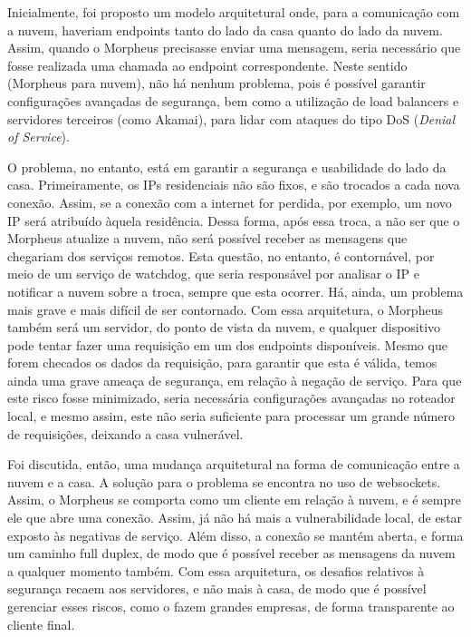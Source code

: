 Inicialmente, foi proposto um modelo arquitetural onde, para a comunicação com a nuvem, haveriam endpoints tanto do lado da casa quanto do lado da nuvem. Assim, quando o Morpheus precisasse enviar uma mensagem, seria necessário que fosse realizada uma chamada ao endpoint correspondente. Neste sentido (Morpheus para nuvem), não há nenhum problema, pois é possível garantir configurações avançadas de segurança, bem como a utilização de load balancers e servidores terceiros (como Akamai), para lidar com ataques do tipo DoS (\textit{Denial of Service}).

O problema, no entanto, está em garantir a segurança e usabilidade do lado da casa. Primeiramente, os IPs residenciais não são fixos, e são trocados a cada nova conexão. Assim, se a conexão com a internet for perdida, por exemplo, um novo IP será atribuído àquela residência. Dessa forma, após essa troca, a não ser que o Morpheus atualize a nuvem, não será possível receber as mensagens que chegariam dos serviços remotos. Esta questão, no entanto, é contornável, por meio de um serviço de watchdog, que seria responsável por analisar o IP e notificar a nuvem sobre a troca, sempre que esta ocorrer. Há, ainda, um problema mais grave e mais difícil de ser contornado. Com essa arquitetura, o Morpheus também será um servidor, do ponto de vista da nuvem, e qualquer dispositivo pode tentar fazer uma requisição em um dos endpoints disponíveis. Mesmo que forem checados os dados da requisição, para garantir que esta é válida, temos ainda uma grave ameaça de segurança, em relação à negação de serviço. Para que este risco fosse minimizado, seria necessária configurações avançadas no roteador local, e mesmo assim, este não seria suficiente para processar um grande número de requisições, deixando a casa vulnerável.

Foi discutida, então, uma mudança arquitetural na forma de comunicação entre a nuvem e a casa. A solução para o problema se encontra no uso de websockets. Assim, o Morpheus se comporta como um cliente em relação à nuvem, e é sempre ele que abre uma conexão. Assim, já não há mais a vulnerabilidade local, de estar exposto às negativas de serviço. Além disso, a conexão se mantém aberta, e forma um caminho full duplex, de modo que é possível receber as mensagens da nuvem a qualquer momento também. Com essa arquitetura, os desafios relativos à segurança recaem aos servidores, e não mais à casa, de modo que é possível gerenciar esses riscos, como o fazem grandes empresas, de forma transparente ao cliente final.

